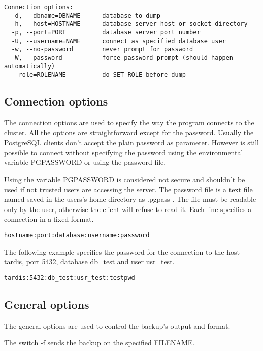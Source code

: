 \begin{verbatim}
Connection options:
  -d, --dbname=DBNAME      database to dump
  -h, --host=HOSTNAME      database server host or socket directory
  -p, --port=PORT          database server port number
  -U, --username=NAME      connect as specified database user
  -w, --no-password        never prompt for password
  -W, --password           force password prompt (should happen automatically)
  --role=ROLENAME          do SET ROLE before dump

\end{verbatim}

\subsection{Connection options}
The connection options are used to specify the way the program connects to the cluster. All the options are 
straightforward except for the password. Usually the PostgreSQL clients don't accept the plain password as 
parameter. However is still possible to connect without specifying the password using the 
environmental variable PGPASSWORD or using the password file.\newline

Using the variable PGPASSWORD is considered not secure and shouldn't be used if  not trusted users are 
accessing the server. The password file is a text file named saved in the users's home directory as 
.pgpass . The file must be readable only by the user, otherwise the client will refuse to read it.\newline
Each line specifies a connection in a fixed format.
\begin{verbatim}
hostname:port:database:username:password
\end{verbatim}

The following example specifies the password for the connection to the host tardis, port 5432, database 
db\_test and user usr\_test.

\begin{verbatim}
tardis:5432:db_test:usr_test:testpwd
\end{verbatim}

\subsection{General options}
The general options are used to control the backup's output and format. 

The switch -f sends the backup on the specified FILENAME.\newline

